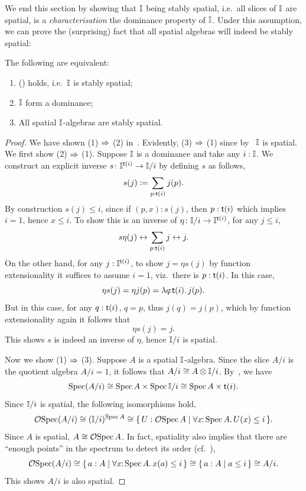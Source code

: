 We end this section by showing that $\mathbb{I}$ being stably spatial, i.e.\ all slices of $\mathbb{I}$ are spatial, is a \emph{characterisation} the dominance property of $\mathbb{I}$. Under this assumption, we can prove the (surprising) fact that all spatial algebras will indeed be stably spatial:

\begin{theorem}\label{thm:chardominance}
  The following are equivalent:
  \begin{enumerate}
    \item (\AxiomSQCI) holds, i.e.\ $\mathbb{I}$ is stably spatial;
    \item $\mathbb{I}$ form a dominance;
    \item All spatial $\mathbb{I}$-algebras are stably spatial.
  \end{enumerate}
\end{theorem}
\begin{proof}
  We have shown (1) $\Rightarrow$ (2) in~. Evidently, (3) $\Rightarrow$ (1) since by~ $\mathbb{I}$ is spatial. We first show (2) $\Rightarrow$ (1). Suppose $\mathbb{I}$ is a dominance and take any $i:\mathbb{I}$. We construct an explicit inverse $s \colon \mathbb{I}^{\mathsf{t}(i)} \to \mathbb{I}/i$ by defining $s$ as follows,
  \[ s(j) \coloneq \sum_{p:\mathsf{t}(i)} j(p). \]
  By construction $s(j) \le i$, since if $(p,x) : s(j)$, then $p : \mathsf{t}(i)$ which implies $i = 1$, hence $x \le i$. To show this is an inverse of $\eta \colon \mathbb{I}/i \to \mathbb{I}^{\mathsf{t}(i)}$, for any $j \le i$,
  \[ s\eta(j) \leftrightarrow \sum_{p:\mathsf{t}(i)}j \leftrightarrow j. \]
  On the other hand, for any $j:\mathbb{I}^{\mathsf{t}(i)}$, to show $j = \eta s(j)$ by function extensionality it suffices to assume $i = 1$, viz.\ there is $p:\mathsf{t}(i)$. In this case, 
  \[ \eta s(j) = \eta j(p) = \lambda q\!\colon\!\!\mathsf{t}(i)\mathpunct{.} j(p). \]
  But in this case, for any $q:\mathsf{t}(i)$, $q = p$, thus $j(q) = j(p)$, which by function extensionality again it follows that 
  \[ \eta s(j) = j. \]
  This shows $s$ is indeed an inverse of $\eta$, hence $\mathbb{I}/i$ is spatial.

  Now we show (1) $\Rightarrow$ (3). Suppose $A$ is a spatial $\mathbb{I}$-algebra. Since the slice $A/i$ is the quotient algebra $A/i = 1$, it follows that $A/i \cong A \otimes \mathbb{I}/i$. By~, we have
  \[ \operatorname{Spec}(A/i) \cong \operatorname{Spec} A \times \operatorname{Spec}{\mathbb{I}/i} \cong \operatorname{Spec} A \times \mathsf{t}(i). \]
  Since $\mathbb{I}/i$ is spatial, the following isomorphisms hold,
  \[ \mathcal{O}{\operatorname{Spec}(A/i)} \cong (\mathbb{I}/i)^{\operatorname{Spec} A} \cong \{\,U:\mathcal{O}{\operatorname{Spec} A}\mid\forall x\!\colon\!\!\operatorname{Spec} A\mathpunct{.} U(x) \le i\,\}. \]
  Since $A$ is spatial, $A \cong \mathcal{O}{\operatorname{Spec} A}$. In fact, spatiality also implies that there are ``enough points'' in the spectrum to detect its order (cf.~),
  \[ \mathcal{O}{\operatorname{Spec}(A/i)} \cong \{\,a:A\mid\forall x\!\colon\!\!\operatorname{Spec} A\mathpunct{.} x(a) \le i\,\} \cong \{\,a:A\mid a \le i\,\} \cong A/i. \]
  This shows $A/i$ is also spatial.
\end{proof}

